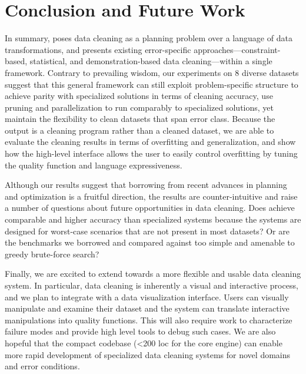 \section{Conclusion and Future Work}
In summary, \sys poses data cleaning as a planning problem over a language of data transformations, and presents existing error-specific approaches---constraint-based, statistical, and demonstration-based data cleaning---within a single framework.
Contrary to prevailing wisdom, our experiments on 8 diverse datasets suggest that this general framework can still exploit problem-specific structure to achieve parity with specialized solutions in terms of cleaning accuracy, use pruning and parallelization to run comparably to specialized solutions, yet maintain the flexibility to clean datasets that span error class.       
Because the output is a cleaning program rather than a cleaned dataset, we are able to evaluate the cleaning results in terms of overfitting and generalization, and show how the high-level interface allows the user to easily control overfitting by tuning the quality function and language expressiveness.  

Although our results suggest that borrowing from recent advances in planning and optimization is a fruitful direction, the results are counter-intuitive and raise a number of questions about future opportunities in data cleaning.  Does \sys achieve comparable and higher accuracy than specialized systems because the systems are designed for worst-case scenarios that are not present in most datasets?  Or are the benchmarks we borrowed and compared against too simple and amenable to greedy brute-force search?   

Finally, we are excited to extend \sys towards a more flexible and usable data cleaning system.  In particular, data cleaning is inherently a visual and interactive process, and we plan to integrate \sys with a data visualization interface.   Users can visually manipulate and examine their dataset and the system can translate interactive manipulations into quality functions.  This will also require work to characterize failure modes and provide high level tools to debug such cases.  We are also hopeful that the compact codebase (<200 loc for the core engine) can enable more rapid development of specialized data cleaning systems for novel domains and error conditions.  


